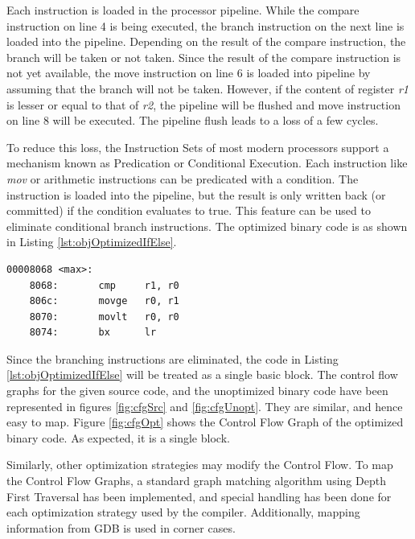 Each instruction is loaded in the processor pipeline. While the compare instruction on line 4 is being executed, the branch instruction on the next line is loaded into the pipeline. Depending on the result of the compare instruction, the branch will be taken or not taken. Since the result of the compare instruction is not yet available, the move instruction on line 6 is loaded into pipeline by assuming that the branch will not be taken. However, if the content of register \emph{r1} is lesser or equal to that of \emph{r2}, the pipeline will be flushed and move instruction on line 8 will be executed. The pipeline flush leads to a loss of a few cycles.

To reduce this loss, the Instruction Sets of most modern processors support a mechanism known as Predication or Conditional Execution. Each instruction like \emph{mov} or arithmetic instructions can be predicated with a condition. The instruction is loaded into the pipeline, but the result is only written back (or committed) if the condition evaluates to true. This feature can be used to eliminate conditional branch instructions. The optimized binary code is as shown in Listing \ref{lst:objOptimizedIfElse}.

\begin{center}
\begin{minipage}{0.7\textwidth}
\begin{lstlisting}[caption={Optimized Object Code},label={lst:objOptimizedIfElse}]
00008068 <max>:
    8068:       cmp     r1, r0
    806c:       movge   r0, r1
    8070:       movlt   r0, r0
    8074:       bx      lr
\end{lstlisting}
\end{minipage}
\end{center}

Since the branching instructions are eliminated, the code in Listing \ref{lst:objOptimizedIfElse} will be treated as a single basic block. The control flow graphs for the given source code, and the unoptimized binary code have been represented in figures \ref{fig:cfgSrc} and \ref{fig:cfgUnopt}. They are similar, and hence easy to map. Figure \ref{fig:cfgOpt} shows the Control Flow Graph of the optimized binary code. As expected, it is a single block. 

Similarly, other optimization strategies may modify the Control Flow. To map the Control Flow Graphs, a standard graph matching algorithm using Depth First Traversal has been implemented, and special handling has been done for each optimization strategy used by the compiler. Additionally, mapping information from GDB is used in corner cases.

